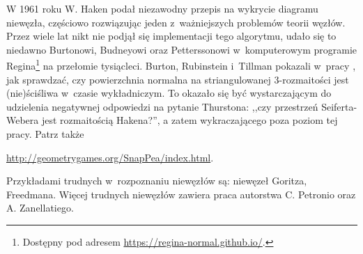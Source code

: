 W 1961 roku W. Haken \cite{haken61} podał niezawodny przepis na wykrycie diagramu niewęzła,
częściowo rozwiązując jeden z~ważniejszych problemów teorii węzłów.
Przez wiele lat nikt nie podjął się implementacji tego algorytmu,
udało się to niedawno Burtonowi, Budneyowi oraz Petterssonowi w~komputerowym programie Regina\footnote{Dostępny pod adresem \url{https://regina-normal.github.io/}.} na przełomie tysiącleci.
Burton, Rubinstein i~Tillman pokazali w~pracy \cite{burton12}, jak sprawdzać,
czy powierzchnia normalna na striangulowanej 3-rozmaitości jest (nie)ściśliwa w~czasie wykładniczym.
To okazało się być wystarczającym do udzielenia negatywnej odpowiedzi na pytanie Thurstona:
,,czy przestrzeń Seiferta-Webera jest rozmaitością Hakena?'',
a zatem wykraczającego poza poziom tej pracy.
Patrz także {\url{http://geometrygames.org/SnapPea/index.html}.

Przykładami trudnych w~rozpoznaniu niewęzłów są: niewęzeł Goritza, Freedmana.
Więcej trudnych niewęzłów zawiera praca \cite{zanellati16} autorstwa C. Petronio oraz A. Zanellatiego.

}
